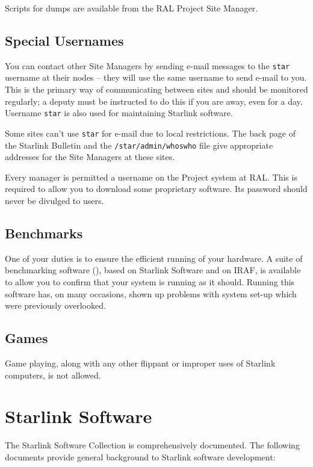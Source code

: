 Scripts for dumps are available from the RAL Project Site Manager.

\subsection {Special Usernames}

You can contact other Site Managers by sending e-mail messages to the {\tt star}
username at their nodes  -- they will use the same username to send e-mail to
you.
This is the primary way of communicating between sites and
should be monitored regularly; a deputy must be instructed to do this if you
are away, even for a day.
Username {\tt star} is also used for maintaining Starlink software.

Some sites can't use {\tt star} for e-mail due to local restrictions.
The back page of the Starlink Bulletin and the {\tt /star/admin/whoswho} file
give appropriate addresses for the Site Managers at these sites.

Every manager is permitted a username on the Project system at RAL.
This is required to allow you to download some proprietary software.
Its password should never be divulged to users.

\subsection {Benchmarks}

One of your duties is to ensure the efficient running of your hardware. 
A suite of benchmarking software
(),
based on Starlink Software and on IRAF, is available to allow you to confirm
that your system is running as it should.
Running this software has, on many occasions, shown up problems with system
set-up which were previously overlooked.

\subsection {Games}

Game playing, along with any other flippant or improper uses of Starlink
computers, is not allowed.

\newpage

\section {\label{starlinksoftware}Starlink Software}

The Starlink Software Collection is comprehensively documented.
The following documents provide general background to Starlink software
development:

